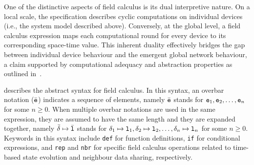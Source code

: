 One of the distinctive aspects of field calculus is its dual interpretive nature. 
 On a local scale, the specification describes cyclic computations on individual devices 
 (i.e., the system model described above). 
% 
Conversely, at the global level, 
 a field calculus expression maps each computational round for every device to its corresponding space-time value. 
 This inherent duality effectively bridges the gap between individual device behaviour and the emergent global network behaviour,
 a claim supported by computational adequacy and abstraction properties as outlined in~\cite{audrito2019tocl}.

 describes the abstract syntax for field calculus. 
 In this syntax, an overbar notation ($\bar{\texttt{e}}$) indicates a sequence of elements, 
 namely $\bar{\texttt{e}}$ stands for $\texttt{e}_1, \texttt{e}_2, \ldots, \texttt{e}_n$ for some $n \geq 0$.
 When multiple overbar notations are used in the same expression,
 they are assumed to have the same length and they are expanded together,
 namely $\bar{\delta} \mapsto \bar{\texttt{l}}$ stands for $\delta_1 \mapsto \texttt{l}_1, \delta_2 \mapsto \texttt{l}_2, \ldots, \delta_n \mapsto \texttt{l}_n$ for some $n \geq 0$.
 Keywords in this syntax include \texttt{def} for function definitions, 
 \texttt{if} for conditional expressions, 
 and \texttt{rep} and \texttt{nbr} for specific field calculus operations related to time-based state evolution and neighbour data sharing, respectively.


